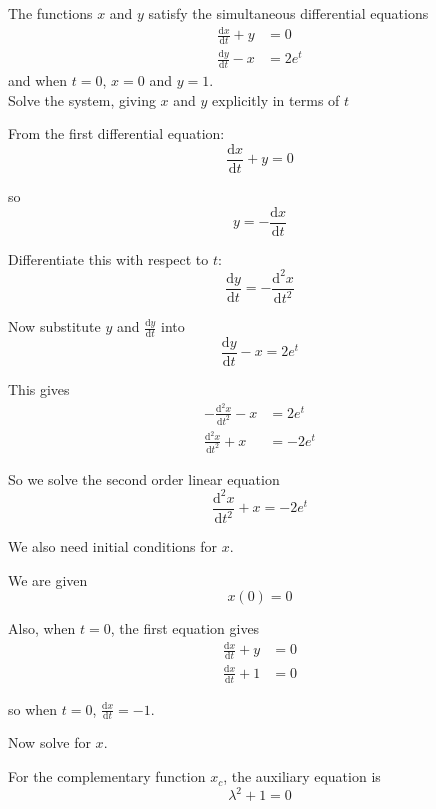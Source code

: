 \documentclass[leqno]{article}
\begin{document}
\begin{enumerate}[
  label=\textbf{\arabic*.},
  leftmargin=*,
  topsep=0pt,
  partopsep=0pt,
  parsep=0pt
]
\newpage

\questionitem

The functions $x$ and $y$ satisfy the simultaneous differential equations \\
\begin{align*}
\frac{\mathrm{d}x}{\mathrm{d}t}+y&=0\\[5pt]
\frac{\mathrm{d}y}{\mathrm{d}t}-x&=2e^{t}
\end{align*}
and when $t=0$, $x=0$ and $y=1$. \\

Solve the system, giving $x$ and $y$ explicitly in terms of $t$  \\

\vspace*{10pt}

\begin{djsSolution}
From the first differential equation:
\[
\frac{\mathrm{d}x}{\mathrm{d}t}+y=0
\]

so
\[
y=-\frac{\mathrm{d}x}{\mathrm{d}t}
\]

Differentiate this with respect to $t$:
\[
\frac{\mathrm{d}y}{\mathrm{d}t}=-\frac{\mathrm{d}^2x}{\mathrm{d}t^2}
\]

Now substitute $y$ and $\frac{\mathrm{d}y}{\mathrm{d}t}$ into
\[
\frac{\mathrm{d}y}{\mathrm{d}t}-x=2e^t
\]

This gives
\begin{align*}
-\frac{\mathrm{d}^2x}{\mathrm{d}t^2}-x&=2e^t \\
\frac{\mathrm{d}^2x}{\mathrm{d}t^2}+x&=-2e^t
\end{align*}

So we solve the second order linear equation
\[
\frac{\mathrm{d}^2x}{\mathrm{d}t^2}+x=-2e^t
\]

We also need initial conditions for $x$.

We are given
\[
x(0)=0
\]

Also, when $t=0$, the first equation gives
\begin{align*}
\frac{\mathrm{d}x}{\mathrm{d}t}+y&=0 \\
\frac{\mathrm{d}x}{\mathrm{d}t}+1&=0
\end{align*}

so when $t=0$, $\frac{\mathrm{d}x}{\mathrm{d}t}=-1$.

Now solve for $x$.

For the complementary function $x_c$, the auxiliary equation is
\[
\lambda^2+1=0
\]


\end{djsSolution}
\end{enumerate}
\end{document}
